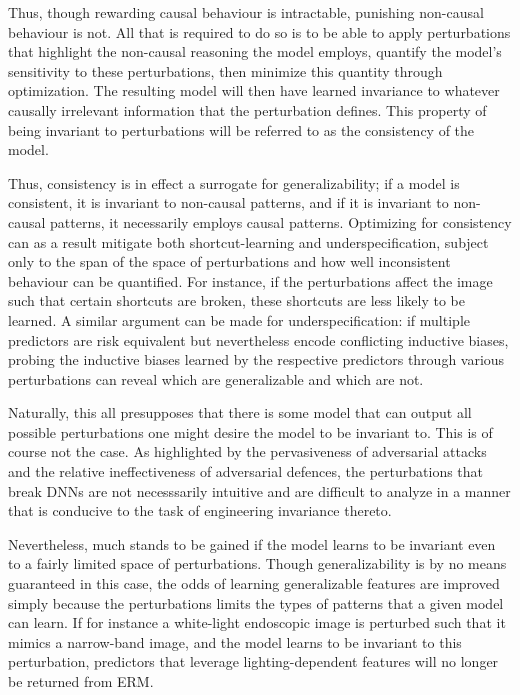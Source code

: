 Thus, though rewarding causal behaviour is intractable, punishing non-causal behaviour is not. All that is required to do so is to be able to apply perturbations that highlight the non-causal reasoning the model employs, quantify the model's sensitivity to these perturbations, then minimize this quantity through optimization. The resulting model will then have learned invariance to whatever causally irrelevant information that the perturbation defines. This property of being invariant to perturbations will be referred to as the consistency of the model. 

Thus, consistency is in effect a surrogate for generalizability; if a model is consistent, it is invariant to non-causal patterns, and if it is invariant to non-causal patterns, it necessarily employs causal patterns. Optimizing for consistency can as a result mitigate both shortcut-learning and underspecification, subject only to the span of the space of perturbations and how well inconsistent behaviour can be quantified. For instance, if the perturbations affect the image such that certain shortcuts are broken, these shortcuts are less likely to be learned. A similar argument can be made for underspecification: if multiple predictors are risk equivalent but nevertheless encode conflicting inductive biases, probing the inductive biases learned by the respective predictors through various perturbations can reveal which are generalizable and which are not.

Naturally, this all presupposes that there is some model that can output all possible perturbations one might desire the model to be invariant to. This is of course not the case. As highlighted by the pervasiveness of adversarial attacks and the relative ineffectiveness of adversarial defences, the perturbations that break DNNs are not necesssarily intuitive and are difficult to analyze in a manner that is conducive to the task of engineering invariance thereto. 

Nevertheless, much stands to be gained if the model learns to be invariant even to a fairly limited space of perturbations. Though generalizability is by no means guaranteed in this case, the odds of learning generalizable features are improved simply because the perturbations limits the types of patterns that a given model can learn. If for instance a white-light endoscopic image is perturbed such that it mimics a narrow-band image, and the model learns to be invariant to this perturbation, predictors that leverage lighting-dependent features will no longer be returned from ERM.

